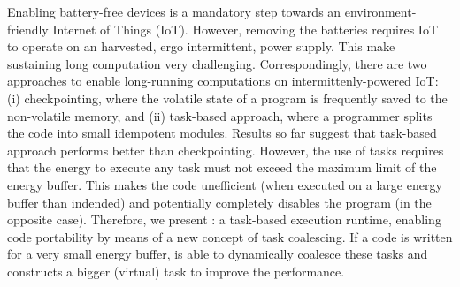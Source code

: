 Enabling battery-free devices is a mandatory step towards an environment-friendly Internet of Things (IoT). However, removing the batteries requires IoT to operate on an harvested, ergo intermittent, power supply. This make sustaining long computation very challenging. Correspondingly, there are two approaches to enable long-running computations on intermittenly-powered IoT: (i) checkpointing, where the volatile state of a program is frequently saved to the non-volatile memory, and (ii) task-based approach, where a programmer splits the code into small idempotent modules. Results so far suggest that task-based approach performs better than checkpointing. However, the use of tasks requires that the energy to execute any task must not exceed the maximum limit of the energy buffer. This makes the code unefficient (when executed on a large energy buffer than indended) and potentially completely disables the program (in the opposite case). Therefore, we present \sys: a task-based execution runtime, enabling code portability by means of a new concept of task coalescing. If a code is written for a very small energy buffer, \sys is able to dynamically coalesce these tasks and constructs a bigger (virtual) task to improve the performance. 